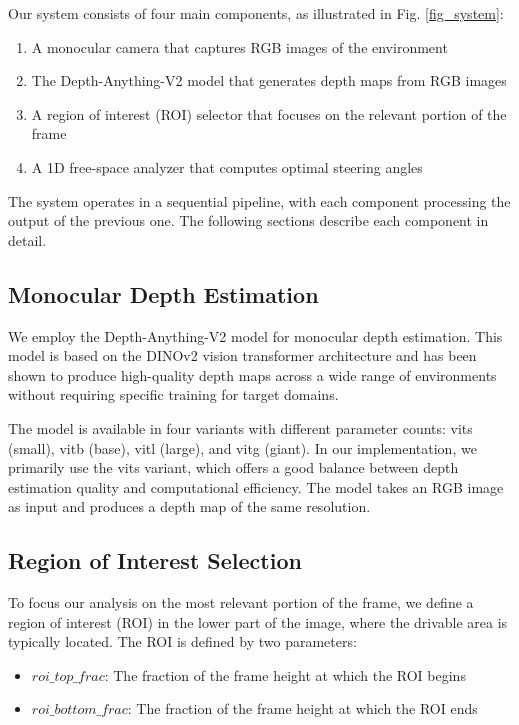 \documentclass[conference]{IEEEtran}
\begin{document}
Our system consists of four main components, as illustrated in Fig. \ref{fig_system}:
\begin{enumerate}
\item A monocular camera that captures RGB images of the environment
\item The Depth-Anything-V2 model that generates depth maps from RGB images
\item A region of interest (ROI) selector that focuses on the relevant portion of the frame
\item A 1D free-space analyzer that computes optimal steering angles
\end{enumerate}

The system operates in a sequential pipeline, with each component processing the output of the previous one. The following sections describe each component in detail.

\subsection{Monocular Depth Estimation}
We employ the Depth-Anything-V2 model for monocular depth estimation. This model is based on the DINOv2 vision transformer architecture and has been shown to produce high-quality depth maps across a wide range of environments without requiring specific training for target domains.

The model is available in four variants with different parameter counts: vits (small), vitb (base), vitl (large), and vitg (giant). In our implementation, we primarily use the vits variant, which offers a good balance between depth estimation quality and computational efficiency. The model takes an RGB image as input and produces a depth map of the same resolution.

\subsection{Region of Interest Selection}
To focus our analysis on the most relevant portion of the frame, we define a region of interest (ROI) in the lower part of the image, where the drivable area is typically located. The ROI is defined by two parameters:
\begin{itemize}
\item $roi\_top\_frac$: The fraction of the frame height at which the ROI begins
\item $roi\_bottom\_frac$: The fraction of the frame height at which the ROI ends
\end{itemize}
\end{document}
